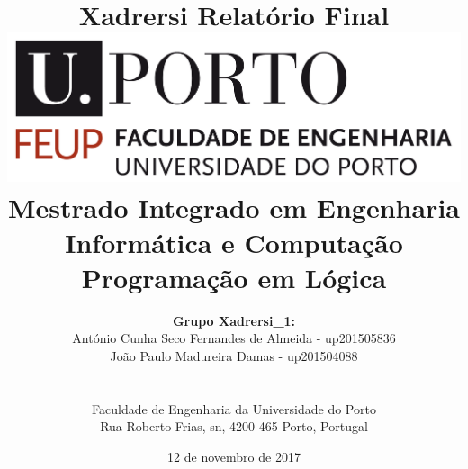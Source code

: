 \documentclass[a4paper]{article}
\begin{document}
\setlength{\textwidth}{16cm}
\setlength{\textheight}{22cm}

\title{\Huge\textbf{Xadrersi}\linebreak\linebreak\linebreak
\Large\textbf{Relatório Final}\linebreak\linebreak
\linebreak\linebreak
\includegraphics[scale=0.1]{feup-logo.png}\linebreak\linebreak
\linebreak\linebreak
\Large{Mestrado Integrado em Engenharia Informática e Computação} \linebreak\linebreak
\Large{Programação em Lógica}\linebreak
}

\author{\textbf{Grupo Xadrersi\_1:}\\ António Cunha Seco Fernandes de Almeida - up201505836 \\ João Paulo Madureira Damas - up201504088 \\\linebreak\linebreak \\
 \\ Faculdade de Engenharia da Universidade do Porto \\ Rua Roberto Frias, s\/n, 4200-465 Porto, Portugal \linebreak\linebreak\linebreak
\linebreak\linebreak\vspace{1cm}}
\date{12 de novembro de 2017}
\maketitle
\thispagestyle{empty}
\end{document}
